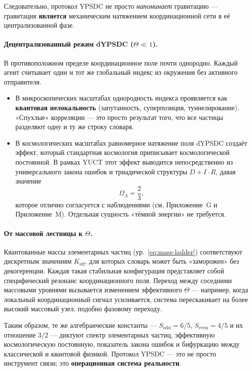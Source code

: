 \documentclass[12pt,a4paper]{article}
\theoremstyle{remark}
\begin{document}
	Следовательно, протокол YPSDC не просто \emph{напоминает} гравитацию — гравитация \textbf{является} механическим натяжением координационной сети в её централизованной фазе.
	
	\paragraph{Децентрализованный режим dYPSDC (\(\Theta \ll 1\)).}
	В противоположном пределе координационное поле почти однородно. Каждый агент считывает один и тот же глобальный индекс из окружения без активного отправителя. 
	\begin{itemize}
		\item В микроскопических масштабах однородность индекса проявляется как \textbf{квантовая нелокальность} (запутанность, суперпозиция, туннелирование). «Спухлые» корреляции — это просто результат того, что все частицы разделяют одну и ту же строку словаря.
		\item В космологических масштабах равномерное натяжение поля dYPSDC создаёт эффект, который стандартная космология приписывает космологической постоянной. В рамках YUCT этот эффект выводится непосредственно из универсального закона ошибок и триадической структуры \(D+I\!\cdot\!R\), давая значение
		\[
		\Omega_{\Lambda} = \frac{2}{3},
		\]
		которое отлично согласуется с наблюдениями (см. Приложение~G и Приложение~M). Отдельная сущность «тёмной энергии» не требуется.
	\end{itemize}
	
	\paragraph{От массовой лестницы к \(\Theta\).}
	Квантованные массы элементарных частиц (ур.~\ref{eq:mass-ladder}) соответствуют дискретным значениям \(K_{\mathrm{eff}}\), для которых словарь может быть «заморожен» без декогеренции. Каждая такая стабильная конфигурация представляет собой специфический резонанс координационного поля. Переход между соседними массовыми уровнями вызывается изменением эффективного \(\Theta\) — например, когда локальный координационный сигнал усиливается, система перескакивает на более высокий массовый узел, подобно фазовому переходу.
	
	Таким образом, те же алгебраические константы — \(S_{\mathrm{odd}} = 6/5\), \(S_{\mathrm{even}} = 4/5\) и их отношение \(3/2\) — диктуют спектр элементарных частиц, эффективную космологическую постоянную, показатель закона ошибок и бифуркацию между классической и квантовой физикой. Протокол YPSDC — это не просто инструмент связи; это \textbf{операционная система реальности}.
	
\end{document}
